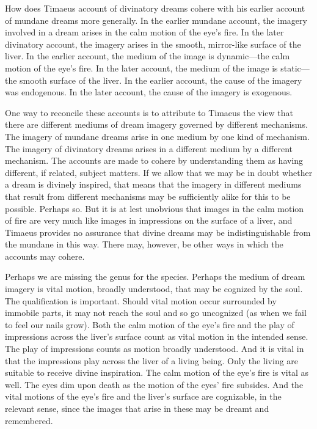 How does Timaeus account of divinatory dreams cohere with his earlier account of mundane dreams more generally. In the earlier mundane account, the imagery involved in a dream arises in the calm motion of the eye's fire. In the later divinatory account, the imagery arises in the smooth, mirror-like surface of the liver. In the earlier account, the medium of the image is dynamic---the calm motion of the eye's fire. In the later account, the medium of the image is static---the smooth surface of the liver. In the earlier account, the cause of the imagery was endogenous. In the later account, the cause of the imagery is exogenous. 

One way to reconcile these accounts is to attribute to Timaeus the view that there are different mediums of dream imagery governed by different mechanisms. The imagery of mundane dreams arise in one medium by one kind of mechanism. The imagery of divinatory dreams arises in a different medium by a different mechanism. The accounts are made to cohere by understanding them as having different, if related, subject matters. If we allow that we may be in doubt whether a dream is divinely inspired, that means that the imagery in different mediums that result from different mechanisms may be sufficiently alike for this to be possible. Perhaps so. But it is at lest unobvious that images in the calm motion of fire are very much like images in impressions on the surface of a liver, and Timaeus provides no assurance that divine dreams may be indistinguishable from the mundane in this way. There may, however, be other ways in which the accounts may cohere. 

Perhaps we are missing the genus for the species. Perhaps the medium of dream imagery is vital motion, broadly understood, that may be cognized by the soul. The qualification is important. Should vital motion occur surrounded by immobile parts, it may not reach the soul and so go uncognized (as when we fail to feel our nails grow). Both the calm motion of the eye's fire and the play of impressions across the liver's surface count as vital motion in the intended sense. The play of impressions counts as motion broadly understood. And it is vital in that the impressions play across the liver of a living being. Only the living are suitable to receive divine inspiration. The calm motion of the eye's fire is vital as well. The eyes dim upon death as the motion of the eyes' fire subsides. And the vital motions of the eye's fire and the liver's surface are cognizable, in the relevant sense, since the images that arise in these may be dreamt and remembered.


